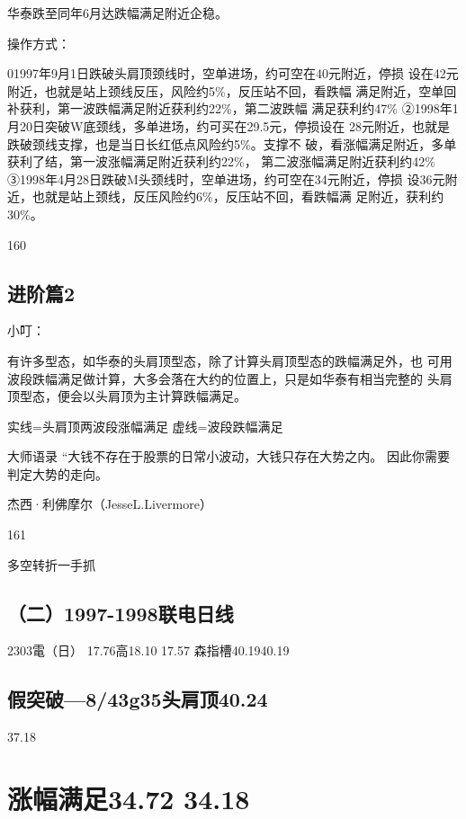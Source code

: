 \documentclass{article}
\begin{document}
华泰跌至同年6月达跌幅满足附近企稳。

操作方式：

01997年9月1日跌破头肩顶颈线时，空单进场，约可空在40元附近，停损 设在42元附近，也就是站上颈线反压，风险约5\%，反压站不回，看跌幅 满足附近，空单回补获利，第一波跌幅满足附近获利约22\%，第二波跌幅 满足获利约47\% ②1998年1月20日突破W底颈线，多单进场，约可买在29.5元，停损设在 28元附近，也就是跌破颈线支撑，也是当日长红低点风险约5\%。支撑不 破，看涨幅满足附近，多单获利了结，第一波涨幅满足附近获利约22\%， 第二波涨幅满足附近获利约42\% ③1998年4月28日跌破M头颈线时，空单进场，约可空在34元附近，停损 设36元附近，也就是站上颈线，反压风险约6\%，反压站不回，看跌幅满 足附近，获利约30\%。

160

\clearpage

\subsection{进阶篇2}

小叮：

有许多型态，如华泰的头肩顶型态，除了计算头肩顶型态的跌幅满足外，也 可用波段跌幅满足做计算，大多会落在大约的位置上，只是如华泰有相当完整的 头肩顶型态，便会以头肩顶为主计算跌幅满足。

实线=头肩顶两波段涨幅满足 虚线=波段跌幅满足

大师语录 “大钱不存在于股票的日常小波动，大钱只存在大势之内。 因此你需要判定大势的走向。

杰西·利佛摩尔（JesseL.Livermore）

161

\clearpage

多空转折一手抓

\subsection{（二）1997-1998联电日线}

2303電（日） 17.76高18.10 17.57 森指槽40.1940.19

\subsection{假突破—8/43g35头肩顶40.24}

37.18

\section{涨幅满足34.72 34.18}
\end{document}
